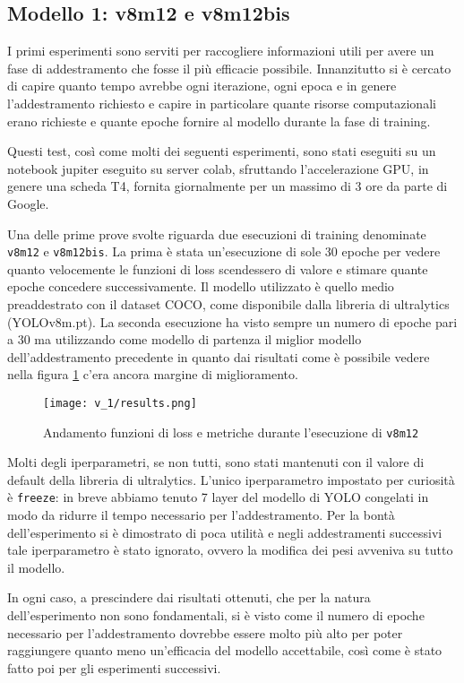 \subsection*{Modello 1: v8m12 e v8m12bis}

I primi esperimenti sono serviti per raccogliere informazioni utili per avere un fase di 
addestramento che fosse il più efficacie possibile. Innanzitutto si è cercato di capire quanto
tempo avrebbe ogni iterazione, ogni epoca e in genere l'addestramento richiesto e capire 
in particolare quante risorse computazionali erano richieste e quante epoche fornire
al modello durante la fase di training.

Questi test, così come molti dei seguenti esperimenti, sono stati eseguiti su un notebook
jupiter eseguito su server colab, sfruttando l'accelerazione GPU, in genere una scheda T4, 
fornita giornalmente per un massimo di 3 ore da parte di Google.


Una delle prime prove svolte riguarda due esecuzioni di training denominate \verb+v8m12+ e \verb+v8m12bis+. 
La prima è stata un'esecuzione di sole 30 epoche per vedere quanto 
velocemente le funzioni di loss scendessero di valore e stimare quante epoche concedere successivamente.
Il modello utilizzato è quello medio preaddestrato con il dataset COCO, come disponibile dalla libreria 
di ultralytics (YOLOv8m.pt).
La seconda esecuzione ha visto sempre un numero di epoche pari a 30 ma utilizzando come modello di
partenza il miglior modello dell'addestramento precedente in quanto dai risultati come è possibile vedere 
nella figura \ref{fig:v1-1} c'era ancora margine di miglioramento.

\begin{figure}[h]
    \centering
    \texttt{[image: v\_1/results.png]}
    \caption{Andamento funzioni di loss e metriche durante l'esecuzione di \texttt{v8m12}}
    \label{fig:v1-1}
    \end{figure}

Molti degli iperparametri, se non tutti, sono stati mantenuti con il valore di default della libreria di ultralytics.
L'unico iperparametro impostato per curiosità è \verb|freeze|: in breve abbiamo tenuto 7 layer del modello 
di YOLO congelati in modo da ridurre il tempo necessario per l'addestramento. Per la bontà dell'esperimento
si è dimostrato di poca utilità e negli addestramenti successivi tale iperparametro è stato ignorato, 
ovvero la modifica dei pesi avveniva su tutto il modello.



In ogni caso, a prescindere dai risultati ottenuti, che per la natura dell'esperimento non sono
fondamentali, si è visto come il numero di epoche necessario per 
l'addestramento dovrebbe essere molto più alto per poter raggiungere quanto meno un'efficacia del modello
accettabile, così come è stato fatto poi per gli esperimenti successivi.